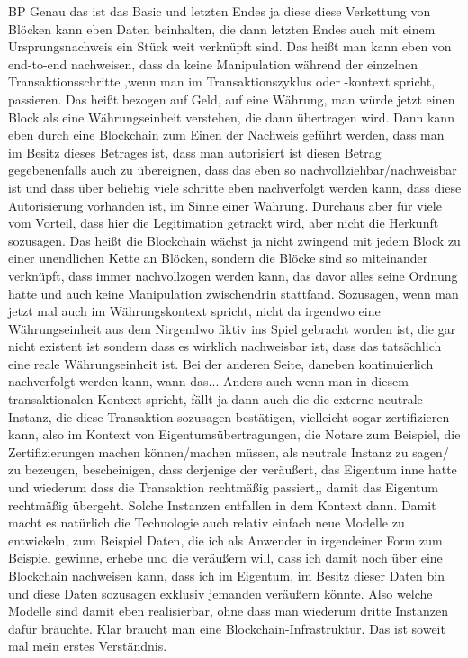 \begin{xlist}
    \item[BP] Genau das ist das Basic und letzten Endes ja diese diese Verkettung von Blöcken kann eben Daten beinhalten, die dann letzten Endes auch mit einem Ursprungsnachweis ein Stück weit verknüpft sind. Das heißt man kann eben von end-to-end nachweisen, dass da keine Manipulation während der einzelnen Transaktionsschritte ,wenn man im Transaktionszyklus oder -kontext spricht, passieren. Das heißt bezogen auf Geld, auf eine Währung, man würde jetzt einen Block als eine Währungseinheit verstehen, die dann übertragen wird. Dann kann eben durch eine Blockchain zum Einen der Nachweis geführt werden, dass man im Besitz dieses Betrages ist, dass man autorisiert ist diesen Betrag gegebenenfalls auch zu übereignen, dass das eben so nachvollziehbar/nachweisbar ist und dass über beliebig viele schritte eben nachverfolgt werden kann, dass diese Autorisierung vorhanden ist, im Sinne einer Währung. Durchaus aber für viele vom Vorteil, dass hier die Legitimation getrackt wird, aber nicht die Herkunft sozusagen. Das heißt die Blockchain wächst ja nicht zwingend mit jedem Block zu einer unendlichen Kette an Blöcken, sondern die Blöcke sind so miteinander verknüpft, dass immer nachvollzogen werden kann, das davor alles seine Ordnung hatte und auch keine Manipulation zwischendrin stattfand. Sozusagen, wenn man jetzt mal auch im Währungskontext spricht, nicht da irgendwo eine Währungseinheit aus dem Nirgendwo fiktiv ins Spiel gebracht worden ist, die gar nicht existent ist sondern dass es wirklich nachweisbar ist, dass das tatsächlich eine reale Währungseinheit ist. Bei der anderen Seite, daneben kontinuierlich nachverfolgt werden kann, wann das... Anders auch wenn man in diesem transaktionalen Kontext spricht, fällt ja dann auch die die externe neutrale Instanz, die diese Transaktion sozusagen bestätigen, vielleicht sogar zertifizieren kann, also im Kontext von Eigentumsübertragungen, die Notare zum Beispiel, die Zertifizierungen machen können/machen müssen, als neutrale Instanz zu sagen/ zu bezeugen, bescheinigen, dass derjenige der veräußert, das Eigentum inne hatte und wiederum dass die Transaktion rechtmäßig passiert,, damit das Eigentum rechtmäßig übergeht. Solche Instanzen entfallen in dem Kontext dann. Damit macht es natürlich die Technologie auch relativ einfach neue Modelle zu entwickeln, zum Beispiel Daten, die ich als Anwender in irgendeiner Form zum Beispiel gewinne, erhebe und die veräußern will, dass ich damit noch über eine Blockchain nachweisen kann, dass ich im Eigentum, im Besitz dieser Daten bin und diese Daten sozusagen exklusiv jemanden veräußern könnte. Also welche Modelle sind damit eben realisierbar, ohne dass man wiederum dritte Instanzen dafür bräuchte. Klar braucht man eine Blockchain-Infrastruktur. Das ist soweit mal mein erstes Verständnis.

\end{xlist}
